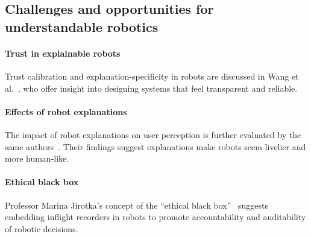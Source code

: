 \subsection{Challenges and opportunities for understandable robotics}

\paragraph{Trust in explainable robots}
Trust calibration and explanation-specificity in robots are discussed in Wang et al.~\cite{trust-explainable}, who offer insight into designing systems that feel transparent and reliable.

\paragraph{Effects of robot explanations}
The impact of robot explanations on user perception is further evaluated by the same authors~\cite{explanations-effect}. Their findings suggest explanations make robots seem livelier and more human-like.

\paragraph{Ethical black box}
Professor Marina Jirotka’s concept of the “ethical black box”~\cite{ethical-black-box} suggests embedding inflight recorders in robots to promote accountability and auditability of robotic decisions.
